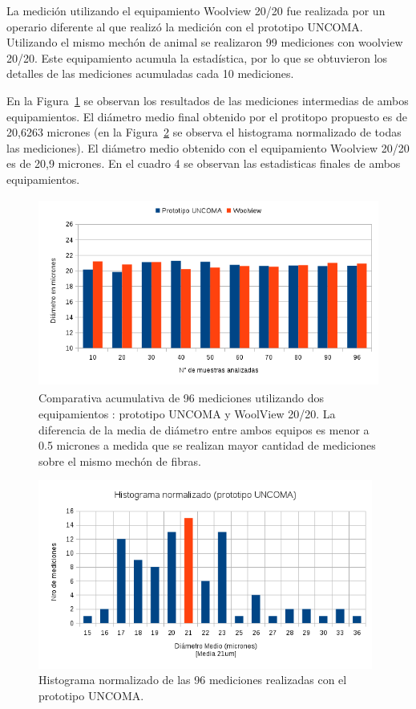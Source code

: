 \documentclass[runningheads,a4paper]{llncs}
\begin{document}
La medición utilizando el equipamiento Woolview 20/20 fue realizada por un operario diferente al que realizó la medición con el prototipo UNCOMA. Utilizando el mismo mechón de animal se realizaron 99 mediciones con woolview 20/20. Este equipamiento acumula la estadística, por lo que se obtuvieron los detalles de las mediciones acumuladas cada 10 mediciones. 

En la Figura~\ref{fig:prototipovswv} se observan los resultados de las mediciones intermedias de ambos equipamientos.
El diámetro medio final obtenido por el protitopo propuesto es de 20,6263 micrones (en la Figura~\ref{fig:histograma} se observa el histograma normalizado de todas las mediciones). El diámetro medio obtenido con el equipamiento Woolview 20/20 es de 20,9 micrones. En el cuadro 4 se observan las estadisticas finales de ambos equipamientos.

\begin{figure}
\centering
\includegraphics[height=6.2cm]{prototipovswv}
\caption{Comparativa acumulativa de 96 mediciones utilizando dos equipamientos : prototipo UNCOMA y WoolView 20/20.
La diferencia de la media de diámetro entre ambos equipos es menor a 0.5 micrones a medida que se realizan mayor cantidad de mediciones sobre el mismo mechón de fibras.}
\label{fig:prototipovswv}
\end{figure}

\begin{figure}
\centering
\includegraphics[height=6.2cm]{histograma}
\caption{Histograma normalizado de las 96 mediciones realizadas con el prototipo UNCOMA.}
\label{fig:histograma}
\end{figure}
\end{document}
